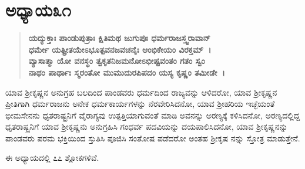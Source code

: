\newpage

\section*{ಅಧ್ಯಾಯ\enginline{-}೩೧}

\begin{verse}
\textbf{ಯದ್ಯುಕ್ತಾಃ ಪಾಂಡುಪುತ್ರಾಃ ಕ್ಷಿತಿಮಥ ಜುಗುಪುಃ ಧರ್ಮರಾಜಸ್ತ್ವರಾವಾನ್} \\\textbf{ಧರ್ಮೇ ಯತ್ಪ್ರೀತಯೇಽಭೂತ್ಪವನಜವಚನೈಃ ಆಂಭಿಕೇಯಂ ವಿರಕ್ತಮ್~।}\\\textbf{ವ್ಯಾಸಾತ್ಮಾ ಯೋ ವನಸ್ಥಂ ತ್ವಕೃತನಿಜಮನೋಽಭೀಷ್ಟವಂತಂ ಗತಂ ಸ್ವಂ}\\\textbf{ನಾಥಂ ಪಾರ್ಥಾಃ ಸ್ಮರಂತೋ ಮುಮುದುರಪಿಪದಂ ಯಸ್ಯ ಕೃಷ್ಣಂ ತಮೀಡೇ~।}
\end{verse}

ಯಾವ ಶ‍್ರೀಕೃಷ್ಣನ ಅನುಗ್ರಹ ಬಲದಿಂದ ಪಾಂಡವರು ಧರ್ಮದಿಂದ ರಾಜ್ಯವನ್ನು ಆಳಿದರೋ, ಯಾವ ಶ‍್ರೀಕೃಷ್ಣನ ಪ್ರೀತಿಗಾಗಿ ಧರ್ಮರಾಜನು ಅನೇಕ ಧರ್ಮಕಾರ್ಯಗಳನ್ನು ನೆರವೇರಿಸಿದನೋ, ಯಾವ ಶ‍್ರೀಹರಿಯ ಇಚ್ಛೆಯಂತೆ ಭೀಮಸೇನನು ಧೃತರಾಷ್ಟ್ರನಿಗೆ ವೈರಾಗ್ಯವು ಉತ್ಪತ್ತಿಯಾಗುವಂತೆ ಮಾಡಿ ಅವನನ್ನು ಅರಣ್ಯಕ್ಕೆ ಕಳಿಸಿದನೋ, ಅರಣ್ಯದಲ್ಲಿದ್ದ ಧೃತರಾಷ್ಟ್ರನಿಗೆ ಯಾವ ಶ‍್ರೀಕೃಷ್ಣನು ಅನುಗ್ರಹಿಸಿ ಗಂಧರ್ವ ಪದವಿಯನ್ನು ದಯಪಾಲಿಸಿದನೋ, ಯಾವ ಶ‍್ರೀಕೃಷ್ಣನನ್ನು ಪಾಂಡವರು ಪರಮ ಭಕ್ತಿಯಿಂದ ಸ್ತುತಿಸಿ ಪೂಜಿಸಿ ಸಂತೋಷ ಪಡೆದರೋ ಅಂತಹ ಶ‍್ರೀಕೃಷ ನನ್ನು ಸ್ತೋತ್ರ ಮಾಡುತ್ತೇನೆ.

ಈ ಅಧ್ಯಾಯದಲ್ಲಿ ೭೭ ಶ್ಲೋಕಗಳಿವೆ.

